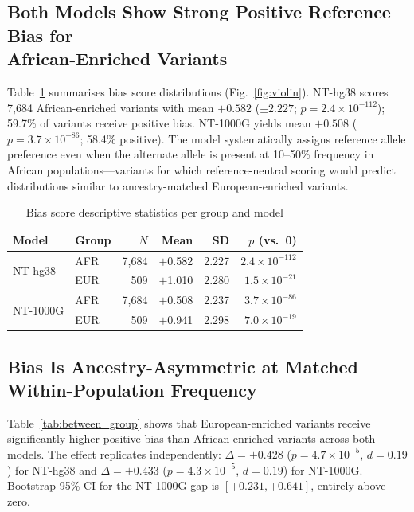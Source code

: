 \documentclass[conference]{IEEEtran}
\begin{document}
\subsection{Both Models Show Strong Positive Reference Bias for\\African-Enriched Variants}

Table~\ref{tab:descriptive} summarises bias score distributions (Fig.~\ref{fig:violin}). NT-hg38 scores
7{,}684 African-enriched variants with mean $+0.582$ (${\pm}2.227$;
$p{=}2.4{\times}10^{-112}$); 59.7\% of variants receive positive bias.
NT-1000G yields mean $+0.508$ ($p{=}3.7{\times}10^{-86}$; 58.4\% positive).
The model systematically assigns reference allele preference even when the
alternate allele is present at 10--50\% frequency in African populations---variants
for which reference-neutral scoring would predict distributions similar to
ancestry-matched European-enriched variants.

\begin{table}[t]
\caption{Bias score descriptive statistics per group and model}
\label{tab:descriptive}
\centering
\renewcommand{\arraystretch}{1.15}
\begin{tabular}{@{}llrrrr@{}}
\toprule
Model & Group & $N$ & Mean & SD & $p$ (vs.\ 0) \\
\midrule
\multirow{2}{*}{NT-hg38}
  & AFR & 7,684 & $+$0.582 & 2.227 & $2.4{\times}10^{-112}$ \\
  & EUR &   509 & $+$1.010 & 2.280 & $1.5{\times}10^{-21}$ \\
\midrule
\multirow{2}{*}{NT-1000G}
  & AFR & 7,684 & $+$0.508 & 2.237 & $3.7{\times}10^{-86}$ \\
  & EUR &   509 & $+$0.941 & 2.298 & $7.0{\times}10^{-19}$ \\
\bottomrule
\end{tabular}
\end{table}

\subsection{Bias Is Ancestry-Asymmetric at Matched Within-Population Frequency}

Table~\ref{tab:between_group} shows that European-enriched variants receive
significantly higher positive bias than African-enriched variants across both
models. The effect replicates independently: $\Delta{=}{+}0.428$
($p{=}4.7{\times}10^{-5}$, $d{=}0.19$) for NT-hg38 and $\Delta{=}{+}0.433$
($p{=}4.3{\times}10^{-5}$, $d{=}0.19$) for NT-1000G. Bootstrap 95\% CI for
the NT-1000G gap is $[{+}0.231,{+}0.641]$, entirely above zero.
\end{document}
